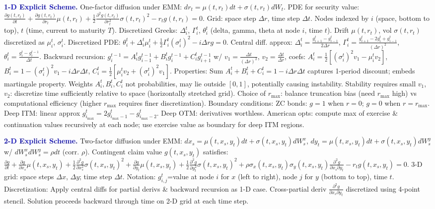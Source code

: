 \documentclass[landscape]{article}
\begin{document}
\begin{multicols}{4}
\textcolor{blue}{\textbf{1-D Explicit Scheme.}} One-factor diffusion under EMM: $dr_t=\mu(t,r_t)dt+\sigma(t,r_t)dW_t$. PDE for security value: $\frac{\partial g(t,r_t)}{\partial t}+\frac{\partial g(t,r_t)}{\partial r_t}\mu(t,r_t)+\frac{1}{2}\frac{\partial^2 g(t,r_t)}{\partial r_t^2}\sigma(t,r_t)^2-r_t g(t,r_t)=0$. Grid: space step $\Delta r$, time step $\Delta t$. Nodes indexed by $i$ (space, bottom to top), $t$ (time, current to maturity $T$). Discretized Greeks: $\Delta_i^t$, $\Gamma_i^t$, $\theta_i^t$ (delta, gamma, theta at node $i$, time $t$). Drift $\mu(t,r_t)$, vol $\sigma(t,r_t)$ discretized as $\mu_i^t$, $\sigma_i^t$. Discretized PDE: $\theta_i^t+\Delta_i^t\mu_i^t+\frac{1}{2}\Gamma_i^t(\sigma_i^t)^2-i\Delta r g=0$. Central diff. approx: $\Delta_i^t=\frac{g_{i+1}^t-g_{i-1}^t}{2\Delta r}$, $\Gamma_i^t=\frac{g_{i+1}^t-2g_i^t+g_{i-1}^t}{(\Delta r)^2}$, $\theta_i^t=\frac{g_i^t-g_i^{t-1}}{\Delta t}$. Backward recursion: $g_i^{t-1}=A_i^t g_{i-1}^{t-1}+B_i^t g_i^{t-1}+C_i^t g_{i+1}^{t-1}$ w/ $v_1=\frac{\Delta t}{(\Delta r)^2}$, $v_2=\frac{\Delta t}{\Delta r}$, coefs: $A_i^t=\frac{1}{2}[(\sigma_i^t)^2 v_1-\mu_i^t v_2]$, $B_i^t=1-(\sigma_i^t)^2 v_1-i\Delta r\Delta t$, $C_i^t=\frac{1}{2}[\mu_i^t v_2+(\sigma_i^t)^2 v_1]$. Properties: Sum $A_i^t+B_i^t+C_i^t=1-i\Delta r\Delta t$ captures 1-period discount; embeds martingale property. Weights $A_i^t,B_i^t,C_i^t$ not probabilities, may lie outside $[0,1]$, potentially causing instability. Stability requires small $v_1$, $v_2$: discretize time sufficiently relative to space (horizontally stretched grid). Choice of $r_{\max}$: balance truncation bias (need $r_{\max}$ high) vs computational efficiency (higher $r_{\max}$ requires finer discretization). Boundary conditions: ZC bonds: $g=1$ when $r=0$; $g=0$ when $r=r_{\max}$. Deep ITM: linear approx $g_{i_{\max}}^t=2g_{i_{\max}-1}^t-g_{i_{\max}-2}^t$. Deep OTM: derivatives worthless. American opts: compute max of exercise \& continuation values recursively at each node; use exercise value as boundary for deep ITM regions.

\textcolor{blue}{\textbf{2-D Explicit Scheme.}} Two-factor diffusion under EMM: $dx_s=\mu(t,x_s,y_t)dt+\sigma(t,x_s,y_t)dW_s^x$, $dy_t=\mu(t,x_s,y_t)dt+\sigma(t,x_s,y_t)dW_s^y$ w/ $dW_s^x dW_s^y=\rho dt$ (corr. $\rho$). Contingent claim value $g(t,x_s,y_t)$ satisfies: $\frac{\partial g}{\partial t}+\frac{\partial g}{\partial x_s}\mu(t,x_s,y_t)+\frac{1}{2}\frac{\partial^2 g}{\partial x_s^2}\sigma(t,x_s,y_t)^2+\frac{\partial g}{\partial y_t}\mu(t,x_s,y_t)+\frac{1}{2}\frac{\partial^2 g}{\partial y_t^2}\sigma(t,x_s,y_t)^2+\rho\sigma_x(t,x_s,y_t)\sigma_y(t,x_s,y_t)\frac{\partial^2 g}{\partial x_s\partial y_t}-r_t g(t,x_s,y_t)=0$. 3-D grid: space steps $\Delta x$, $\Delta y$; time step $\Delta t$. Notation: $g_{i,j}^t$=value at node $i$ for $x$ (left to right), node $j$ for $y$ (bottom to top), time $t$. Discretization: Apply central diffs for partial derivs \& backward recursion as 1-D case. Cross-partial deriv $\frac{\partial^2 g}{\partial x_s\partial y_t}$ discretized using 4-point stencil. Solution proceeds backward through time on 2-D grid at each time step.


\end{multicols}
\end{document}
